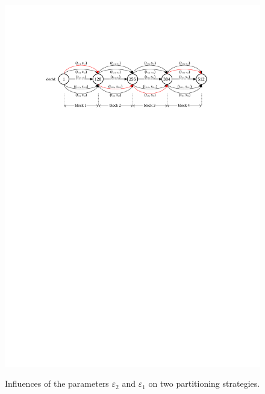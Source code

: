 \documentclass{sig-alternate-05-2015}
\begin{document}
\begin{figure}
{		\includegraphics[width=1.0\linewidth]{rcsp}
	}
	
	\caption{Influences of the parameters $\varepsilon_{2}$ and $\varepsilon_{1}$ on two partitioning strategies.}
	\label{fig:parameter}
\end{figure}
\end{document}
